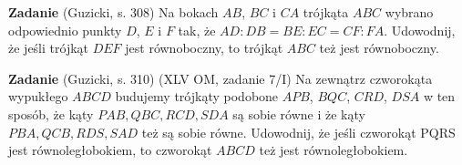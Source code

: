 \textbf{Zadanie} (Guzicki, s. 308)
Na bokach $AB$, $BC$ i $CA$ trójkąta $ABC$ wybrano odpowiednio punkty $D$, $E$ i $F$ tak, że $AD : DB = BE : EC = CF : FA$.
Udowodnij, że jeśli trójkąt $DEF$ jest równoboczny, to trójkąt $ABC$ też jest równoboczny.

\textbf{Zadanie} (Guzicki, s. 310)
(XLV OM, zadanie 7/I)
Na zewnątrz czworokąta wypukłego $ABCD$ budujemy trójkąty podobone $APB$, $BQC$, $CRD$, $DSA$ w ten sposób, że kąty $PAB, QBC, RCD, SDA$ są sobie równe i że kąty $PBA, QCB, RDS, SAD$ też są sobie równe.
Udowodnij, że jeśli czworokąt PQRS jest równoległobokiem, to czworokąt $ABCD$ też jest równoległobokiem.

%